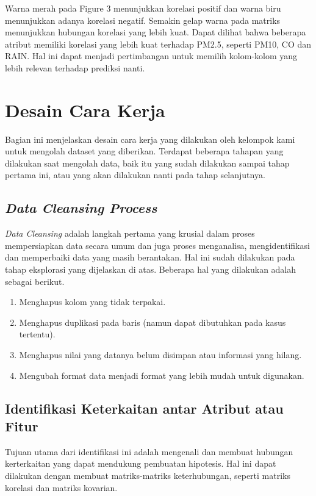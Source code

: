 \documentclass{article}
\begin{document}
\begin{normalsize}
        \noindent Warna merah pada Figure 3 menunjukkan korelasi positif dan warna biru menunjukkan adanya korelasi negatif.
        Semakin gelap warna pada matriks menunjukkan hubungan korelasi yang lebih kuat. Dapat dilihat bahwa beberapa
        atribut memiliki korelasi yang lebih kuat terhadap PM2.5, seperti PM10, CO dan RAIN. Hal ini dapat menjadi
        pertimbangan untuk memilih kolom-kolom yang lebih relevan terhadap prediksi nanti.

        \section{Desain Cara Kerja}
        Bagian ini menjelaskan desain cara kerja yang dilakukan oleh kelompok kami untuk mengolah dataset yang 
        diberikan. Terdapat beberapa tahapan yang dilakukan saat mengolah data, baik itu yang sudah dilakukan 
        sampai tahap pertama ini, atau yang akan dilakukan nanti pada tahap selanjutnya.

        \subsection{\textit{Data Cleansing Process}}
        \textit{Data Cleansing} adalah langkah pertama yang krusial dalam proses mempersiapkan data secara 
        umum dan juga proses menganalisa, mengidentifikasi dan memperbaiki data yang masih berantakan. Hal ini
        sudah dilakukan pada tahap eksplorasi yang dijelaskan di atas. Beberapa hal yang dilakukan adalah
        sebagai berikut.
        \begin{enumerate}[label=\alph*.]
            \item Menghapus kolom yang tidak terpakai.
            \item Menghapus duplikasi pada baris (namun dapat dibutuhkan pada kasus tertentu).
            \item Menghapus nilai yang datanya belum disimpan atau informasi yang hilang.
            \item Mengubah format data menjadi format yang lebih mudah untuk digunakan.
        \end{enumerate}

        \subsection{Identifikasi Keterkaitan antar Atribut atau Fitur}
        Tujuan utama dari identifikasi ini adalah mengenali dan membuat hubungan kerterkaitan yang dapat
        mendukung pembuatan hipotesis. Hal ini dapat dilakukan dengan membuat matriks-matriks keterhubungan,
        seperti matriks korelasi dan matriks kovarian.


\end{normalsize}
\end{document}
